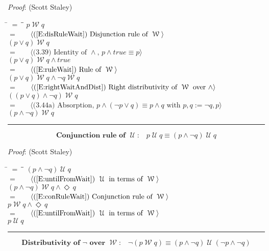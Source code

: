 \documentclass[12pt, fleqn, leqno]{article}
\newcommand{\lgap}{2pt}                             %
\newcommand{\mymathindent}{24pt}                    %
\newcommand{\Until}{\;\mathcal{U}\;}
\newcommand{\Wait}{\;\mathcal{W}\;}
\newcommand{\Event}{\Diamond\,}
\newcommand{\myqed}{\rule[-.23ex]{1.2ex}{2.0ex}}
\newcommand{\myqedtab}{\hspace{384pt}}              %
\newcommand{\Gll} {\langle}                         %
\newcommand{\Ggg} {\rangle}                         %
\newcommand{\Hint}[1]     {\ \ \ $\Gll              \mbox{#1} \Ggg$ }   %
\begin{document}
\emph{Proof}: (Scott Staley)
\begin{tabbing}
\hspace{\mymathindent} \= $= \;$ \= \myqedtab \= \kill
\> \> $p\Wait q$\\[\lgap]
\> $=$ \> \Hint{(\ref{E:disRuleWait}) Disjunction rule of $\Wait$} \\[\lgap]
\> \> $(p\lor q)\Wait q$\\[\lgap]
\> $=$ \> \Hint{(3.39) Identity of $\land$, $p\land true \equiv p$} \\[\lgap]
\> \> $(p\lor q)\Wait q\land true$\\[\lgap]
\> $=$ \> \Hint{(\ref{E:ruleWait}) Rule of $\Wait$} \\[\lgap]
\> \> $(p\lor q)\Wait q\land \neg q\Wait q$\\[\lgap]
\> $=$ \> \Hint{(\ref{E:rightWaitAndDist}) Right distributivity of $\Wait$ over $\land$} \\[\lgap]
\> \> $((p\lor q)\land \neg q)\Wait q$\\[\lgap]
\> $=$ \> \Hint{(3.44a) Absorption, $p\land (\neg p\lor q) \equiv p\land q$ with $p,q := \neg q,p$} \\[\lgap]
\> \> $(p\land \neg q) \Wait q$ \quad \myqed
\end{tabbing}
\begin{equation}\label{E:conRuleUntil}
\textbf{Conjunction rule of $\Until$:}\quad p\Until q\equiv (p\land \neg q)\Until q
\end{equation}

\emph{Proof}: (Scott Staley)
\begin{tabbing}
\hspace{\mymathindent} \= $= \;$ \= \myqedtab \= \kill
\> \> $(p\land \neg q)\Until q$\\[\lgap]
\> $=$ \> \Hint{(\ref{E:untilFromWait}) $\Until$ in terms of $\Wait$} \\[\lgap]
\> \> $(p\land \neg q)\Wait q \land \Event q$\\[\lgap]
\> $=$ \> \Hint{(\ref{E:conRuleWait}) Conjunction rule of $\Wait$} \\[\lgap]
\> \> $p\Wait q \land \Event q$\\[\lgap]
\> $=$ \> \Hint{(\ref{E:untilFromWait}) $\Until$ in terms of $\Wait$} \\[\lgap]
\> \> $p \Until q$ \quad \myqed
\end{tabbing}
\begin{equation}\label{E:notWait2}
\textbf{Distributivity of $\neg$ over $\Wait$:}\quad \neg(p\Wait q)\equiv (p\land \neg q)\Until(\neg p\land \neg q)
\end{equation}
\end{document}
